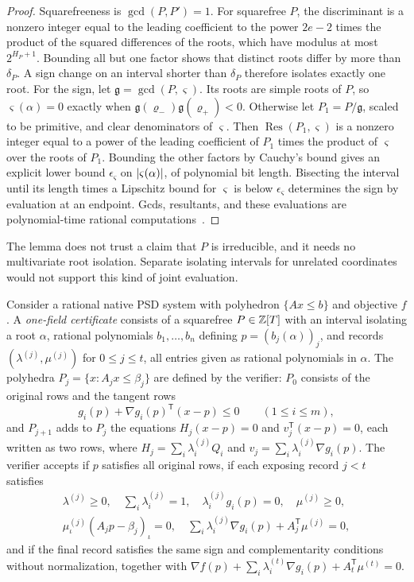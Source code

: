 \begin{proof}
Squarefreeness is $\gcd(P,P')=1$. For squarefree $P$, the discriminant is
a nonzero integer equal to the leading coefficient to the power $2e-2$ times
the product of the squared differences of the roots, which have modulus at
most $2^{H_P+1}$. Bounding all but one factor shows that distinct roots differ
by more than $\delta_P$. A sign change on an interval shorter than $\delta_P$
therefore isolates exactly one root. For the sign, let $\mathfrak g=\gcd(P,\varsigma)$. Its roots are simple
roots of $P$, so $\varsigma(\alpha)=0$ exactly when
$\mathfrak g(\varrho_-)\mathfrak g(\varrho_+)<0$. Otherwise let
$P_1=P/\mathfrak g$, scaled to be primitive, and clear denominators of
$\varsigma$. Then $\operatorname{Res}(P_1,\varsigma)$ is a nonzero integer equal
to a power of the leading coefficient of $P_1$ times the product of
$\varsigma$ over the roots of $P_1$. Bounding the other factors by Cauchy's
bound gives an explicit lower bound $\epsilon_\varsigma$ on
$\left\lvert\varsigma(\alpha)\right\rvert$, of polynomial bit length. Bisecting the interval
until its length times a Lipschitz bound for $\varsigma$ is below
$\epsilon_\varsigma$ determines the sign by evaluation at an endpoint. Gcds,
resultants, and these evaluations are polynomial-time rational
computations~\cite{vonzurGathenGerhard2013}.
\end{proof}

The lemma does not trust a claim that $P$ is irreducible, and it needs no
multivariate root isolation. Separate isolating intervals for unrelated
coordinates would not support this kind of joint evaluation.

\begin{definition}
\label{def:qc-certificate}
Consider a rational native PSD system with polyhedron $\{Ax\le b\}$ and
objective $f$. A \emph{one-field certificate} consists of a squarefree
$P\in\mathbb Z[T]$ with an interval isolating a root $\alpha$, rational polynomials
$b_1,\ldots,b_n$ defining $p=(b_j(\alpha))_j$, and records
$(\lambda^{(j)},\mu^{(j)})$ for $0\le j\le t$, all entries given as rational
polynomials in $\alpha$. The polyhedra $P_j=\{x:A_jx\le\beta_j\}$ are defined
by the verifier: $P_0$ consists of the original rows and the tangent rows
\[
g_i(p)+\nabla g_i(p)^{\mathsf T}(x-p)\le0\qquad(1\le i\le m),
\]
and $P_{j+1}$ adds to $P_j$ the equations $H_j(x-p)=0$ and $v_j^{\mathsf
T}(x-p)=0$, each written as two rows, where $H_j=\sum_i\lambda^{(j)}_iQ_i$ and
$v_j=\sum_i\lambda^{(j)}_i\nabla g_i(p)$. The verifier accepts if $p$
satisfies all original rows, if each exposing record $j<t$ satisfies
\begin{gather*}
\lambda^{(j)}\ge0,\quad\sum_i\lambda^{(j)}_i=1,\quad
\lambda^{(j)}_ig_i(p)=0,\quad\mu^{(j)}\ge0,\\
\mu^{(j)}_\iota(A_jp-\beta_j)_\iota=0,\quad
\sum_i\lambda^{(j)}_i\nabla g_i(p)+A_j^{\mathsf T}\mu^{(j)}=0,
\end{gather*}
and if the final record satisfies the same sign and complementarity
conditions without normalization, together with
$\nabla f(p)+\sum_i\lambda^{(t)}_i\nabla g_i(p)+A_t^{\mathsf T}\mu^{(t)}=0$.
\end{definition}

